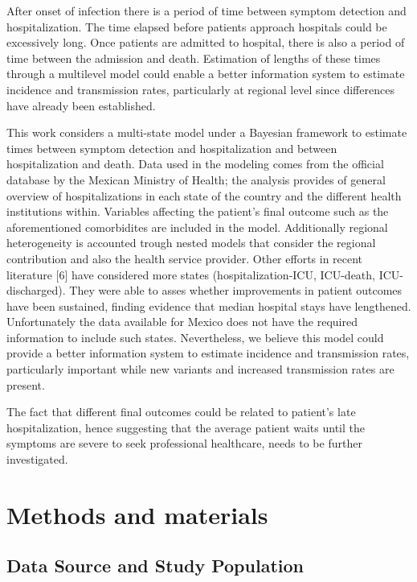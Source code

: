 \documentclass[10pt,letterpaper]{article}
\begin{document}
After onset of infection there is a period of time between symptom
detection and hospitalization. The time elapsed before patients approach
hospitals could be excessively long. Once patients are admitted to
hospital, there is also a period of time between the admission and
death. Estimation of lengths of these times through a multilevel model
could enable a better information system to estimate incidence and
transmission rates, particularly at regional level since differences
have already been established.

This work considers a multi-state model under a Bayesian framework to
estimate times between symptom detection and hospitalization and between
hospitalization and death. Data used in the modeling comes from the
official database by the Mexican Ministry of Health; the analysis
provides of general overview of hospitalizations in each state of the
country and the different health institutions within. Variables
affecting the patient's final outcome such as the aforementioned
comorbidites are included in the model. Additionally regional
heterogeneity is accounted trough nested models that consider the
regional contribution and also the health service provider. Other
efforts in recent literature {[}6{]} have considered more states
(hospitalization-ICU, ICU-death, ICU-discharged). They were able to
asses whether improvements in patient outcomes have been sustained,
finding evidence that median hospital stays have lengthened.
Unfortunately the data available for Mexico does not have the required
information to include such states. Nevertheless, we believe this model
could provide a better information system to estimate incidence and
transmission rates, particularly important while new variants and
increased transmission rates are present.

The fact that different final outcomes could be related to patient's
late hospitalization, hence suggesting that the average patient waits
until the symptoms are severe to seek professional healthcare, needs to
be further investigated.

\section{Methods and materials}\label{methods-and-materials}

\subsection{Data Source and Study
Population}\label{data-source-and-study-population}
\end{document}
